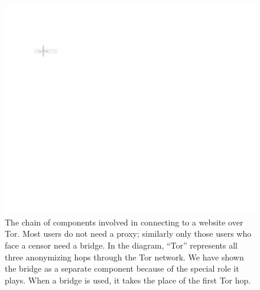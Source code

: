 \documentclass[USenglish,oneside,twocolumn]{article}
\begin{document}
\begin{figure}
\centering
\includegraphics{topology.pdf}
\caption{
The chain of components involved in connecting to a website over Tor.
Most users do not need a proxy;
similarly only those users who face a censor need a bridge.
In the diagram, ``Tor'' represents all three anonymizing hops through the Tor network.
We have shown the bridge as a separate component
because of the special role it plays.
When a bridge is used, it takes the place of the first Tor hop.
}
\label{fig:topology}
\end{figure}
\end{document}
